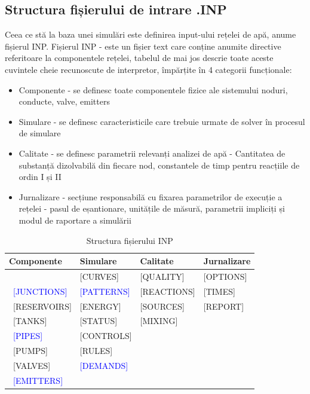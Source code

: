 \subsection{Structura fișierului de intrare .INP}
Ceea ce stă la baza unei simulări este definirea input-ului rețelei de apă, anume fișierul INP. Fișierul INP - este un fișier text care conține anumite directive referitoare la componentele rețelei, 
tabelul de mai jos descrie toate aceste cuvintele cheie recunoscute de interpretor, împărțite în 4 categorii funcționale:

\begin{itemize}
    \item Componente - se definesc toate componentele fizice ale sistemului noduri, conducte, valve, emitters
    \item Simulare - se definesc caracteristicile care trebuie urmate de solver în procesul de simulare
    \item Calitate - se definesc parametrii relevanți analizei de apă - Cantitatea de substanță dizolvabilă din fiecare nod, constantele de timp pentru reacțiile de ordin I și II
    \item Jurnalizare - secțiune responsabilă cu fixarea parametrilor de execuție a rețelei - pasul de eșantionare, unitățile de măsură, parametrii impliciți și modul de raportare a simulării
\end{itemize}



\begin{table}[H]
\begin{tabular}{ p{3cm} p{3cm} p{3cm} p{3cm} }

Componente  & Simulare  & Calitate  & Jurnalizare \\
 \hline
 [TITLE] & [CURVES] & [QUALITY] & [OPTIONS] \\\
 \textcolor{blue}{[JUNCTIONS]} & \textcolor{blue}{[PATTERNS]} & [REACTIONS] & [TIMES] \\\
 [RESERVOIRS]& [ENERGY]& [SOURCES] &[REPORT] \\\
 [TANKS]& [STATUS] &[MIXING]& \\\
 \textcolor{blue}{[PIPES]} & [CONTROLS] &  &  \\\
 [PUMPS] & [RULES] &  & \\\
 [VALVES] & \textcolor{blue}{[DEMANDS]} & & \\\
 \textcolor{blue}{[EMITTERS]} & & &
\end{tabular}
\caption{Structura fișierului INP} \label{tabel:INP_Structure}
\end{table}



